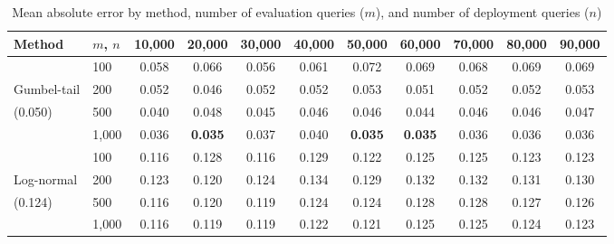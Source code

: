 \begin{table}[h]
\centering
\begin{tabular}{llccccccccc}
\toprule
Method & $m$, $n$ & 10,000 & 20,000 & 30,000 & 40,000 & 50,000 & 60,000 & 70,000 & 80,000 & 90,000 \\
\midrule
 & 100 & 0.058 & 0.066 & 0.056 & 0.061 & 0.072 & 0.069 & 0.068 & 0.069 & 0.069 \\
Gumbel-tail & 200 & 0.052 & 0.046 & 0.052 & 0.052 & 0.053 & 0.051 & 0.052 & 0.052 & 0.053 \\
(0.050) & 500 & 0.040 & 0.048 & 0.045 & 0.046 & 0.046 & 0.044 & 0.046 & 0.046 & 0.047 \\
& 1,000 & 0.036 & \textbf{0.035} & 0.037 & 0.040 & \textbf{0.035} & \textbf{0.035} & 0.036 & 0.036 & 0.036 \\
\midrule
 & 100 & 0.116 & 0.128 & 0.116 & 0.129 & 0.122 & 0.125 & 0.125 & 0.123 & 0.123 \\
Log-normal & 200 & 0.123 & 0.120 & 0.124 & 0.134 & 0.129 & 0.132 & 0.132 & 0.131 & 0.130 \\
(0.124) & 500 & 0.116 & 0.120 & 0.119 & 0.124 & 0.124 & 0.128 & 0.128 & 0.127 & 0.126 \\
& 1,000 & 0.116 & 0.119 & 0.119 & 0.122 & 0.121 & 0.125 & 0.125 & 0.124 & 0.123 \\
\bottomrule
\end{tabular}
\caption{Mean absolute error by method, number of evaluation queries ($m$), and number of deployment queries ($n$)}
\end{table}


